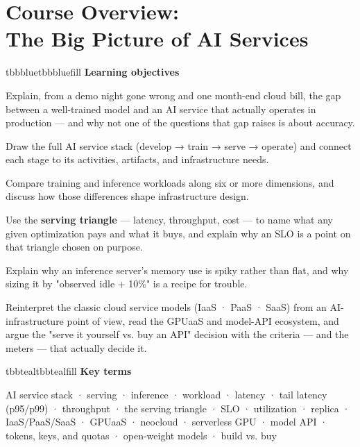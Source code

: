 \setcounter{chapter}{0}
\chapter{Course Overview:\\The Big Picture of AI Services}

\begin{calloutbox}{tbbblue}{tbbbluefill}
{\normalsize\bfseries\color{tbbblue}Learning objectives}\par\vspace{3pt}
\begin{tbbitemize}
  \item Explain, from a demo night gone wrong and one month-end cloud bill, the gap between a well-trained model and an AI service that actually operates in production — and why not one of the questions that gap raises is about accuracy.
  \item Draw the full AI service stack (develop → train → serve → operate) and connect each stage to its activities, artifacts, and infrastructure needs.
  \item Compare training and inference workloads along six or more dimensions, and discuss how those differences shape infrastructure design.
  \item Use the \textbf{serving triangle} — latency, throughput, cost — to name what any given optimization pays and what it buys, and explain why an SLO is a point on that triangle chosen on purpose.
  \item Explain why an inference server's memory use is spiky rather than flat, and why sizing it by "observed idle + 10\%" is a recipe for trouble.
  \item Reinterpret the classic cloud service models (IaaS · PaaS · SaaS) from an AI-infrastructure point of view, read the GPUaaS and model-API ecosystem, and argue the "serve it yourself vs. buy an API" decision with the criteria — and the meters — that actually decide it.
\end{tbbitemize}
\end{calloutbox}

\vspace{5.0pt}

\begin{calloutbox}{tbbteal}{tbbtealfill}
{\normalsize\bfseries\color{tbbteal}Key terms}\par\vspace{3pt}
AI service stack · serving · inference · workload · latency · tail latency (p95/p99) · throughput · the serving triangle · SLO · utilization · replica · IaaS/PaaS/SaaS · GPUaaS · neocloud · serverless GPU · model API · tokens, keys, and quotas · open-weight models · build vs. buy
\end{calloutbox}

